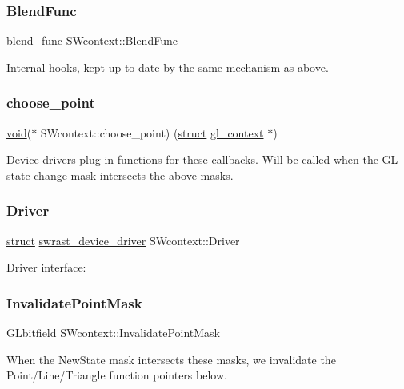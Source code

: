 \subsubsection{\texorpdfstring{Blend\+Func}{BlendFunc}}
{\footnotesize\ttfamily blend\+\_\+func S\+Wcontext\+::\+Blend\+Func}

Internal hooks, kept up to date by the same mechanism as above. \mbox{\label{struct_s_wcontext_a818d839abeda8d1525e472383c3278f7}} 
\subsubsection{\texorpdfstring{choose\+\_\+point}{choose\_point}}
{\footnotesize\ttfamily \hyperlink{interfacevoid}{void}($\ast$ S\+Wcontext\+::choose\+\_\+point) (\hyperlink{interfacestruct}{struct} \hyperlink{structgl__context}{gl\+\_\+context} $\ast$)}

Device drivers plug in functions for these callbacks. Will be called when the GL state change mask intersects the above masks. \mbox{\label{struct_s_wcontext_a0c0417617fb1e6d6a2976aba09a486c2}} 
\subsubsection{\texorpdfstring{Driver}{Driver}}
{\footnotesize\ttfamily \hyperlink{interfacestruct}{struct} \hyperlink{structswrast__device__driver}{swrast\+\_\+device\+\_\+driver} S\+Wcontext\+::\+Driver}

Driver interface\+: \mbox{\label{struct_s_wcontext_ad1c8f5179f8a2433441f63e99461979c}} 
\subsubsection{\texorpdfstring{Invalidate\+Point\+Mask}{InvalidatePointMask}}
{\footnotesize\ttfamily G\+Lbitfield S\+Wcontext\+::\+Invalidate\+Point\+Mask}

When the New\+State mask intersects these masks, we invalidate the Point/\+Line/\+Triangle function pointers below. \mbox{\label{struct_s_wcontext_ada44d3707a3f96b36294bab7e2a95501}} 
